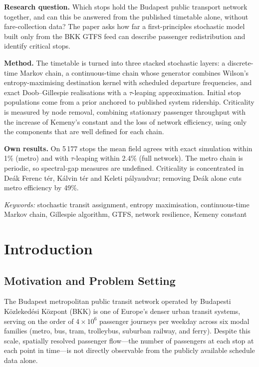 \documentclass[12pt,a4paper]{article}
\theoremstyle{plain}
\theoremstyle{definition}
\theoremstyle{remark}
\begin{document}
\tdkfrontmatter
\tdkcover

\begin{tdkabsztrakt}
\textbf{Research question.} Which stops hold the Budapest public transport
network together, and can this be answered from the published timetable alone,
without fare-collection data? The paper asks how far a first-principles
stochastic model built only from the BKK GTFS feed can describe passenger
redistribution and identify critical stops.

\textbf{Method.} The timetable is turned into three stacked stochastic layers:
a discrete-time Markov chain, a continuous-time chain whose generator combines
Wilson's entropy-maximising destination kernel with scheduled departure
frequencies, and exact Doob--Gillespie realisations with a $\tau$-leaping
approximation. Initial stop populations come from a prior anchored to published
system ridership. Criticality is measured by node removal, combining stationary
passenger throughput with the increase of Kemeny's constant and the loss of
network efficiency, using only the components that are well defined for each
chain.

\textbf{Own results.} On 5\,177 stops the mean field agrees with exact
simulation within 1\% (metro) and with $\tau$-leaping within 2.4\% (full
network). The metro chain is periodic, so spectral-gap measures are
undefined. Criticality is concentrated in De\'ak Ferenc t\'er, K\'alvin t\'er
and Keleti p\'alyaudvar; removing De\'ak alone cuts metro efficiency by 49\%.

\medskip
\noindent\emph{Keywords:} stochastic transit assignment, entropy maximisation,
continuous-time Markov chain, Gillespie algorithm, GTFS, network resilience,
Kemeny constant
\end{tdkabsztrakt}


\clearpage
\tableofcontents

\tdkmaintext
\section{Introduction}
\label{sec:intro}

\subsection{Motivation and Problem Setting}

The Budapest metropolitan public transit network operated by Budapesti
K\"{o}zleked\'{e}si K\"{o}zpont (BKK) is one of Europe's denser urban transit
systems, serving on the order of $4\times10^6$ passenger journeys per weekday
across six modal families (metro, bus, tram, trolleybus, suburban railway, and
ferry).  Despite this scale, spatially resolved passenger flow---the number of
passengers at each stop at each point in time---is not directly observable from
the publicly available schedule data alone.
\end{document}

